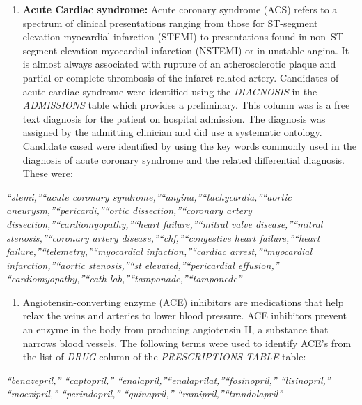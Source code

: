 \documentclass[
]{article}
\providecommand{\tightlist}{%
  \setlength{\itemsep}{0pt}\setlength{\parskip}{0pt}}
\begin{document}
\begin{enumerate}
\def\labelenumi{\arabic{enumi}.}
\tightlist
\item
  \textbf{Acute Cardiac syndrome:} Acute coronary syndrome (ACS) refers
  to a spectrum of clinical presentations ranging from those for
  ST-segment elevation myocardial infarction (STEMI) to presentations
  found in non--ST-segment elevation myocardial infarction (NSTEMI) or
  in unstable angina. It is almost always associated with rupture of an
  atherosclerotic plaque and partial or complete thrombosis of the
  infarct-related artery. Candidates of acute cardiac syndrome were
  identified using the \emph{DIAGNOSIS} in the \emph{ADMISSIONS} table
  which provides a preliminary. This column was is a free text diagnosis
  for the patient on hospital admission. The diagnosis was assigned by
  the admitting clinician and did use a systematic ontology. Candidate
  cased were identified by using the key words commonly used in the
  diagnosis of acute coronary syndrome and the related differential
  diagnosis. These were:
\end{enumerate}

\emph{``stemi,''``acute coronary
syndrome,''``angina,''``tachycardia,''``aortic
aneurysm,''``pericardi,''``ortic dissection,''``coronary artery
dissection,''``cardiomyopathy,''``heart failure,''``mitral valve
disease,''``mitral stenosis,''``coronary artery
disease,''``chf,''``congestive heart failure,''``heart
failure,''``telemetry,''``myocardial infaction,''``cardiac
arrest,''``myocardial infarction,''``aortic stenosis,''``st
elevated,''``pericardial effusion,'' ``cardiomyopathy,''``cath
lab,''``tamponade,''``tamponede''}

\begin{enumerate}
\def\labelenumi{\arabic{enumi}.}
\setcounter{enumi}{1}
\tightlist
\item
  Angiotensin-converting enzyme (ACE) inhibitors are medications that
  help relax the veins and arteries to lower blood pressure. ACE
  inhibitors prevent an enzyme in the body from producing angiotensin
  II, a substance that narrows blood vessels. The following terms were
  used to identify ACE's from the list of \emph{DRUG} column of the
  \emph{PRESCRIPTIONS TABLE} table:
\end{enumerate}

\emph{``benazepril,'' ``captopril,''
``enalapril,''``enalaprilat,''``fosinopril,'' ``lisinopril,''
``moexipril,'' ``perindopril,'' ``quinapril,''
``ramipril,''``trandolapril''}
\end{document}
